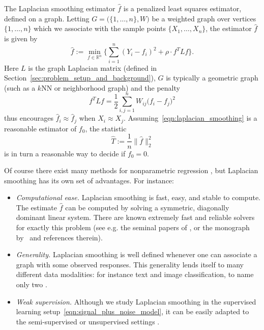 \documentclass[twoside]{article}
\newcommand{\Reals}{\mathbb{R}}
\newcommand{\1}{\mathbf{1}}
\newcommand{\Lap}{L}
\newcommand{\wh}[1]{\widehat{#1}}
\theoremstyle{definition}
\theoremstyle{remark}
\begin{document}
The Laplacian smoothing estimator $\wh{f}$ \citep{smola2003} is a penalized least squares estimator, defined on a graph. Letting $G = \bigl(\{1,\ldots,n\},W\bigr)$ be a weighted graph over vertices $\{1,\ldots,n\}$ which we associate with the sample points $\{X_1,\ldots,X_n\}$, the estimator $\wh{f}$ is given by
\begin{equation}
\label{eqn:laplacian_smoothing}
\wh{f} :=  \min_{f \in \Reals^n} \biggl\{\sum_{i = 1}^{n}(Y_i - f_i)^2 + \rho \cdot f^T \Lap f \biggr\}.
\end{equation}
Here $\Lap$ is the graph Laplacian matrix (defined in Section~\ref{sec:problem_setup_and_background}), $G$ is typically a geometric graph (such as a $k$NN or neighborhood graph) and the penalty
\begin{equation*}
f^T \Lap f = \frac{1}{2} \sum_{i,j = 1}^{n} W_{ij}\bigl(f_i - f_j\bigr)^2
\end{equation*}
thus encourages $\wh{f}_i \approx \wh{f}_j$ when $X_i \approx X_j$. Assuming~\eqref{eqn:laplacian_smoothing} is a reasonable estimator of $f_0$, the statistic
\begin{equation}
\label{eqn:laplacian_smoothing_test}
\wh{T} := \frac{1}{n}\bigl\|\wh{f}\bigr\|_2^2 
\end{equation}
is in turn a reasonable way to decide if $f_0 = 0$. 

Of course there exist many methods for nonparametric regression \citep{gyorfi2006,wasserman2006,tsybakov2008_book}, but Laplacian smoothing has its own set of advantages. For instance:
\begin{itemize}
	\item \emph{Computational ease.} Laplacian smoothing is fast, easy, and stable to compute. The estimate $\wh{f}$ can be computed by solving a symmetric, diagonally dominant linear system. There are known extremely fast and reliable solvers for exactly this problem (see e.g. the seminal papers of \cite{spielman2011,spielman2013,spielman2014}, or the monograph by~\cite{vishnoi2012} and references therein).
	\item \emph{Generality.} Laplacian smoothing is well defined whenever one can associate a graph with some observed responses. This generality lends itself to many different data modalities: for instance text and image classification, to name only two \citep{kondor2002, belkin03a,belkin2006}. 
	\item \emph{Weak supervision.} Although we study Laplacian smoothing in the supervised learning setup~\eqref{eqn:signal_plus_noise_model}, it can be easily adapted to the semi-supervised or unsupervised settings \citep{nadler09,slepcev17,dunlop2020,calder2019b}.
\end{itemize}
\end{document}
